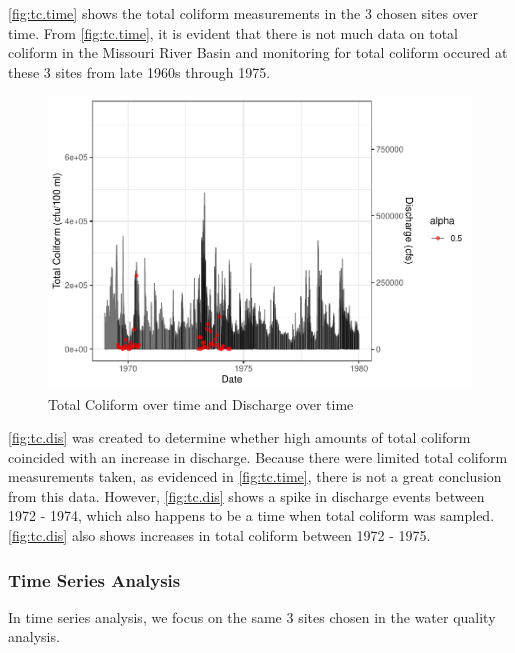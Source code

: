 \documentclass[12pt,]{article}
\begin{document}
\autoref{fig:tc.time} shows the total coliform measurements in the 3
chosen sites over time. From \autoref{fig:tc.time}, it is evident that
there is not much data on total coliform in the Missouri River Basin and
monitoring for total coliform occured at these 3 sites from late 1960s
through 1975.

\begin{figure}
\centering
\includegraphics{Project_Template_files/figure-latex/tc.dis-1.pdf}
\caption{\label{fig:tc.dis}Total Coliform over time and Discharge over
time}
\end{figure}

\autoref{fig:tc.dis} was created to determine whether high amounts of
total coliform coincided with an increase in discharge. Because there
were limited total coliform measurements taken, as evidenced in
\autoref{fig:tc.time}, there is not a great conclusion from this data.
However, \autoref{fig:tc.dis} shows a spike in discharge events between
1972 - 1974, which also happens to be a time when total coliform was
sampled. \autoref{fig:tc.dis} also shows increases in total coliform
between 1972 - 1975.

\newpage

\hypertarget{time-series-analysis}{%
\subsubsection{Time Series Analysis}\label{time-series-analysis}}

In time series analysis, we focus on the same 3 sites chosen in the
water quality analysis.
\end{document}

